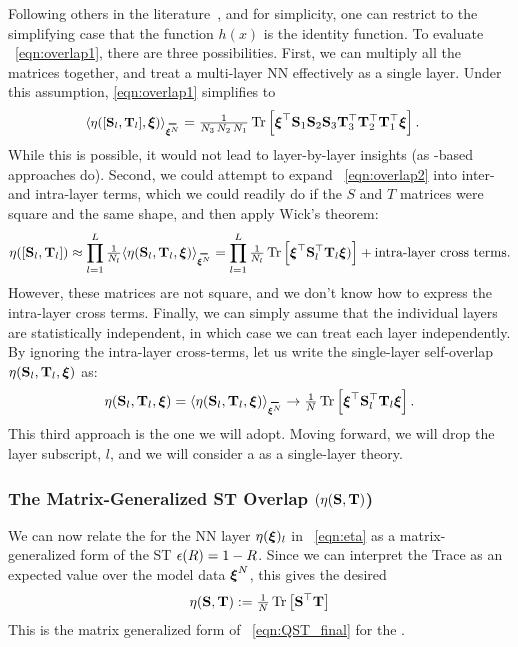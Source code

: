 Following others in the literature~\cite{SMG2013_TR}, and for simplicity, one can restrict to the simplifying case that the function $h(x)$ is the identity function.
To evaluate \EQN~\ref{eqn:overlap1}, there are three possibilities.
First, we can multiply all the matrices together, and treat a multi-layer NN effectively as a single layer.
Under this assumption, \EQN \ref{eqn:overlap1} simplifies to
%
\begin{align}
\label{eqn:overlap2}
  \ETAMLPAVG &= \tfrac{1}{N_3 \, N_2 \, N_1} 
  \Trace{ \boldsymbol{\xi}^\top 
    \mathbf{S}_1 \mathbf{S}_2 \mathbf{S}_3 
    \mathbf{T}_3^{\top} \mathbf{T}_2^{\top} \mathbf{T}_1^{\top} 
    \boldsymbol{\xi} }.
\end{align}
While this is possible, it would not lead to layer-by-layer insights (as \HTSR-based approaches do).
%
Second, we could attempt to expand \EQN~\ref{eqn:overlap2} into inter- and intra-layer terms, 
which we could readily do if the $S$ and $T$ matrices were square and the same shape, and then apply Wick's theorem:
\begin{align}
\ETAMLP\approx\prod_{l=1}^{L}\tfrac{1}{N_l}\ETAMATAVG=\prod_{l=1}^{L}\tfrac{1}{N_l}\Trace{ \XI^{\top} \mathbf{S}^{\top}_{l} \mathbf{T}_{l} \XI) } +\text{intra-layer cross terms}.
\end{align}
However, these matrices are not square, and we don't know how to express the intra-layer cross terms.
%
Finally, we can simply assume that the individual layers are statistically independent, in which case we can treat each layer independently.
By ignoring the intra-layer cross-terms, let us write the single-layer self-overlap $\eta({\mathbf{S}}_l,{\mathbf{T}}_l,\boldsymbol{\xi})$ as:
\begin{align}
  \label{eqn:eta}
  \ETAMAT =
        \ETAMATAVG\rightarrow \tfrac{1}{N} \Trace{ \XI^{\top} \mathbf{S}^{\top}_{l} \mathbf{T}_{l} \XI }  .
\end{align}
This third approach is the one we will adopt.
Moving forward, we will drop the layer subscript, $l$, and we will consider a \SETOL as a single-layer theory.


\subsubsection{The Matrix-Generalized ST Overlap $(\eta({\mathbf{S}},{\mathbf{T}})$)}

We can now relate the \SelfOverlap for the NN layer $\eta(\boldsymbol{\xi})_{l}$ in \EQN~\ref{eqn:eta}
as a matrix-generalized form of the ST \EffectivePotential $\epsilon(R)=1-R$.
Since we can interpret the Trace as an expected value over the model data $\boldsymbol{\xi}^{N}$, this gives the desired
\begin{align}
  \label{eqn:eta_mat_avg_def}
  \eta({\mathbf{S}},{\mathbf{T}})
  :=\tfrac{1}{N} \mbox{}\operatorname{Tr}\left[\mathbf{S}^{\top}\mathbf{T}\right] 
\end{align}
This is the matrix generalized form of \EQN~\ref{eqn:QST_final} for the \LayerQuality.

